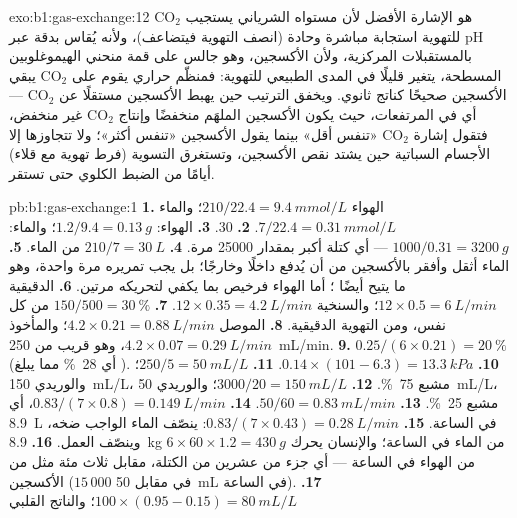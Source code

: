 \begin{solution}{exo:b1:gas-exchange:12}
$\mathrm{CO_2}$ هو الإشارة الأفضل لأن مستواه الشرياني يستجيب
للتهوية استجابة مباشرة وحادة (انصف التهوية فيتضاعف)، ولأنه يُقاس
بدقة عبر pH بالمستقبلات المركزية، ولأن الأكسجين، وهو جالس على قمة
منحني الهيموغلوبين المسطحة، يتغير قليلًا في المدى الطبيعي
للتهوية: فمنظّم حراري يقوم على $\mathrm{CO_2}$ يبقي الأكسجين
صحيحًا كناتج ثانوي. ويخفق الترتيب حين يهبط الأكسجين مستقلًا عن
$\mathrm{CO_2}$ --- أي في المرتفعات، حيث يكون الأكسجين الملهَم
منخفضًا وإنتاج $\mathrm{CO_2}$ غير منخفض، فتقول إشارة
$\mathrm{CO_2}$ «تنفس أقل» بينما يقول الأكسجين «تنفس أكثر»؛ ولا
تتجاوزها إلا الأجسام السباتية حين يشتد نقص الأكسجين، وتستغرق
التسوية (فرط تهوية مع قلاء) أيامًا من الضبط الكلوي حتى تستقر.
\end{solution}

\begin{solution}{pb:b1:gas-exchange:1}
\textbf{1.} الهواء $210/22.4 = \qty{9.4}{mmol/L}$؛ والماء $7/22.4 =
\qty{0.31}{mmol/L}$.
\textbf{2.} 30.
\textbf{3.} الهواء: $1.2/9.4 = \qty{0.13}{g}$؛ والماء: $1000/0.31 =
\qty{3200}{g}$ --- أي كتلة أكبر بمقدار \num{25000} مرة.
\textbf{4.} $210/7 = \qty{30}{L}$ من الماء.
\textbf{5.} الماء أثقل وأفقر بالأكسجين من أن يُدفع داخلًا وخارجًا؛
بل يجب تمريره مرة واحدة، وهو ما يتيح أيضًا ؛ أما
الهواء فرخيص بما يكفي لتحريكه مرتين.
\textbf{6.} الدقيقية $12\times 0.5 = \qty{6}{L/min}$؛ والسنخية
$12\times 0.35 = \qty{4.2}{L/min}$.
\textbf{7.} $150/500 = \qty{30}{\%}$ من كل نفس، ومن التهوية الدقيقية.
\textbf{8.} الموصل $4.2\times 0.21 = \qty{0.88}{L/min}$؛ والمأخوذ
$4.2\times 0.07 = \qty{0.29}{L/min}$، وهو قريب من \qty{250}{mL/min}.
\textbf{9.} $0.25/(6\times 0.21) = \qty{20}{\%}$ (أي \qty{28}{\%} مما
يبلغ ).
\textbf{10.} $0.14\times(101 - 6.3) = \qty{13.3}{kPa}$.
\textbf{11.} $250/5 = \qty{50}{mL/L}$؛ والوريدي \qty{150}{mL/L}،
مشبع \qty{75}{\%}.
\textbf{12.} $3000/20 = \qty{150}{mL/L}$؛ والوريدي \qty{50}{mL/L}،
مشبع \qty{25}{\%}.
\textbf{13.} $50/60 = \qty{0.83}{mL/min}$.
\textbf{14.} $0.83/(7\times 0.8) = \qty{0.149}{L/min}$، أي \qty{8.9}{L}
في الساعة.
\textbf{15.} $0.83/(7\times 0.43) = \qty{0.28}{L/min}$:  ينصّف الماء الواجب ضخه، وينصّف العمل.
\textbf{16.} \qty{8.9}{kg} من الماء في الساعة؛ والإنسان يحرك $6\times
60\times 1.2 = \qty{430}{g}$ من الهواء في الساعة --- أي جزء من عشرين
من الكتلة، مقابل ثلاث مئة مثل من الأكسجين ($15\,000$ في مقابل
\qty{50}{mL} في الساعة).
\textbf{17.} $100\times(0.95 - 0.15) = \qty{80}{mL/L}$؛ والناتج القلبي

\end{solution}

